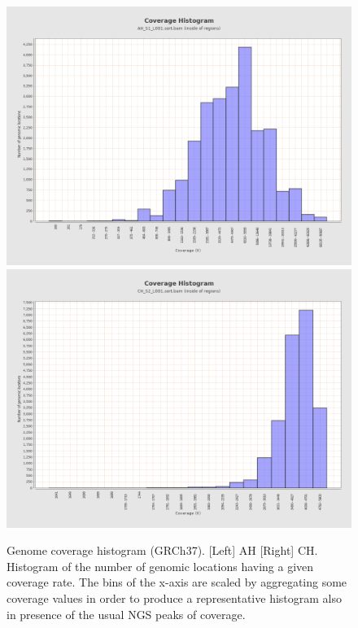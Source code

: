 \documentclass{article}
\begin{document}
\begin{figure}[ht] \hspace*{0cm} 
\begin{center}
    \includegraphics[scale=0.12]{qualimap/AH_S1_L001.sort_stats/images_qualimapReport/genome_coverage_histogram}
        \includegraphics[scale=0.12]{qualimap/CH_S2_L001.sort_stats/images_qualimapReport/genome_coverage_histogram}
	\caption{
	Genome coverage histogram (GRCh37). [Left] AH [Right] CH.
	Histogram of the number of genomic locations having a given coverage rate. The bins of the x-axis are scaled by aggregating some coverage values in order to produce a representative histogram also in presence of the usual NGS peaks of coverage.
	}
	\label{fig:qualimap_gen_cov_hist}
\end{center}
\end{figure}
\end{document}
